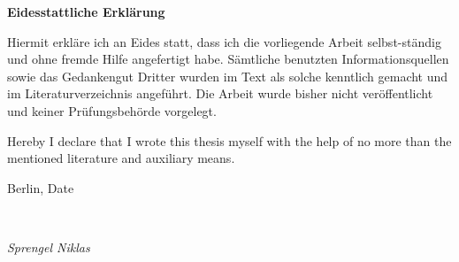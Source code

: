 \newpage

\thispagestyle{empty}

\begin{large}
\vspace*{1.4cm}
\noindent
\begin{center}
{\Large \textbf{Eidesstattliche Erkl{\"a}rung}}
\end{center}

\vspace*{0.5cm}

\noindent
Hiermit erkl{\"a}re ich an Eides statt, dass ich die vorliegende Arbeit selbst-st{\"a}ndig und ohne fremde Hilfe angefertigt habe. S{\"a}mtliche benutzten Informationsquellen sowie das Gedankengut Dritter wurden im Text als solche kenntlich gemacht und im Literaturverzeichnis angef{\"u}hrt. Die Arbeit wurde bisher nicht ver{\"o}ffentlicht und keiner Pr{\"u}fungsbeh{\"o}rde vorgelegt.
\vspace{2cm}

\noindent
Hereby I declare that I wrote this thesis myself with the help of no more than the mentioned literature and auxiliary means.
\vspace{1cm}

\noindent
Berlin, Date

\vspace{3cm}

\hspace*{7cm}%
\dotfill\\
\hspace*{8.5cm}%
\begin{flushright}
\textit{Sprengel Niklas}
\end{flushright}

\end{large}

